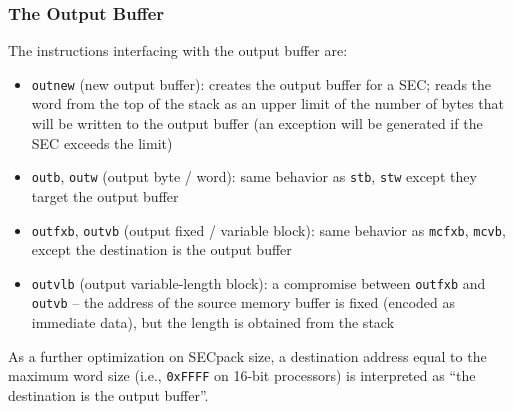 \subsubsection{The Output Buffer}
The instructions interfacing with the output buffer are:
\begin{itemize}
  \item \texttt{outnew} (new output buffer): creates the output buffer for a
  SEC; reads the word from the top of the stack as an upper limit of the number
  of bytes that will be written to the output buffer (an exception will be
  generated if the SEC exceeds the limit)
  \item \texttt{outb}, \texttt {outw} (output byte / word): same behavior as
  \texttt{stb}, \texttt{stw} except they target the output buffer
  \item \texttt{outfxb}, \texttt{outvb} (output fixed / variable block): same
  behavior as \texttt{mcfxb}, \texttt{mcvb}, except the destination is the
  output buffer
  \item \texttt{outvlb} (output variable-length block): a compromise between
  \texttt{outfxb} and \texttt{outvb} -- the address of the source memory buffer
  is fixed (encoded as immediate data), but the length is obtained from the
  stack
\end{itemize}

As a further optimization on SECpack size, a destination address equal to the
maximum word size (i.e., \texttt{0xFFFF} on 16-bit processors) is interpreted
as ``the destination is the output buffer''.


